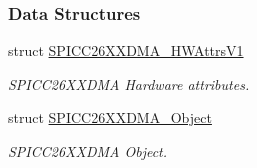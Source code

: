 \subsubsection*{Data Structures}
\begin{DoxyCompactItemize}
\item 
struct \hyperlink{struct_s_p_i_c_c26_x_x_d_m_a___h_w_attrs_v1}{S\+P\+I\+C\+C26\+X\+X\+D\+M\+A\+\_\+\+H\+W\+Attrs\+V1}
\begin{DoxyCompactList}\small\item\em S\+P\+I\+C\+C26\+X\+X\+D\+M\+A Hardware attributes. \end{DoxyCompactList}\item 
struct \hyperlink{struct_s_p_i_c_c26_x_x_d_m_a___object}{S\+P\+I\+C\+C26\+X\+X\+D\+M\+A\+\_\+\+Object}
\begin{DoxyCompactList}\small\item\em S\+P\+I\+C\+C26\+X\+X\+D\+M\+A Object. \end{DoxyCompactList}\end{DoxyCompactItemize}
